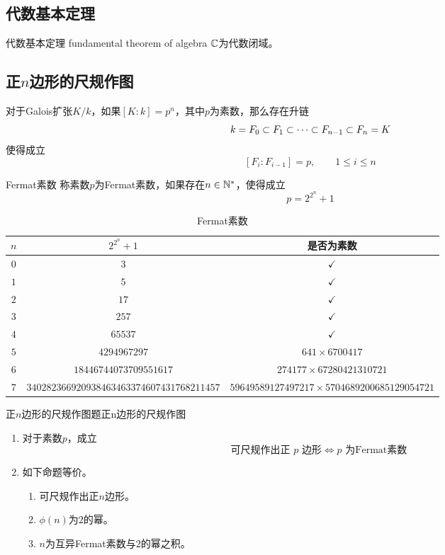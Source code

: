 \subsection{代数基本定理}

\begin{theorem}{代数基本定理 fundamental theorem of algebra}
	$\mathbb{C}$为代数闭域。
\end{theorem}

\subsection{正$n$边形的尺规作图}

\begin{proposition}
	对于Galois扩张$K/k$，如果$[K:k]=p^n$，其中$p$为素数，那么存在升链
	$$
	k=F_0\subset F_1\subset\cdots\subset F_{n-1}\subset F_n=K
	$$
	使得成立%
	$$
	[F_{i}:F_{i-1}]=p,\qquad 1\le i \le n
	$$
\end{proposition}

\begin{definition}{Fermat素数}
	称素数$p$为Fermat素数，如果存在$n\in\mathbb{N}^*$，使得成立%
	$$
	p=2^{2^n}+1
	$$
\end{definition}

\begin{table}[H]  
	\centering  
	\caption{Fermat素数}  
	\begin{tabular}{ccc}
		\toprule  
		$n$ & $2^{2^n}+1$ & 是否为素数 \\ \midrule  
		$0$ & $3$ & $\checkmark$ \\  
		$1$ & $5$ & $\checkmark$ \\  
		$2$ & $17$ & $\checkmark$ \\  
		$3$ & $257$ & $\checkmark$ \\  
		$4$ & $65537$ & $\checkmark$ \\  
		$5$ & $4294967297$ & $641\times 6700417$ \\  
		$6$ & $18446744073709551617$ & $274177\times 67280421310721$ \\
		$7$ & $340282366920938463463374607431768211457$ & $59649589127497217\times 5704689200685129054721$\\ \bottomrule  
	\end{tabular}  
\end{table}

\begin{theorem}{正$n$边形的尺规作图题}{正n边形的尺规作图}
	\begin{enumerate}
		\item 对于素数$p$，成立%
		$$
		\text{可尺规作出正 }p\text{ 边形}\iff
		p\text{ 为Fermat素数}
		$$
		\item 如下命题等价。
		\begin{enumerate}
			\item 可尺规作出正$n$边形。
			\item $\phi(n)$为$2$的幂。
			\item $n$为互异Fermat素数与$2$的幂之积。
		\end{enumerate}
	\end{enumerate}
\end{theorem}

